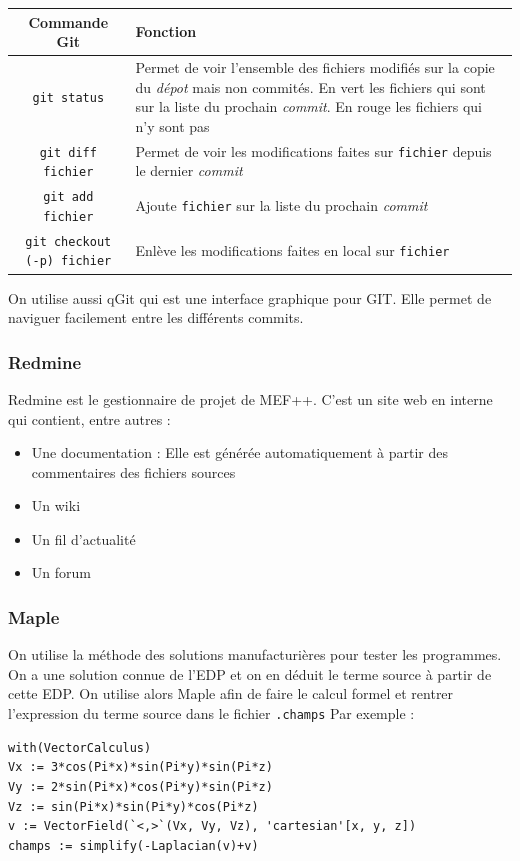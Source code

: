 \documentclass[a4paper,12pt]{article}
\begin{document}
\begin{table}[!h]
\begin{center}
  \begin{tabularx}{\textwidth}{|c|X|}
  \hline
  \textbf{Commande Git} & \textbf{Fonction} \\
  \hline
  \texttt{git status} & Permet de voir l'ensemble des fichiers modifiés sur la copie du \emph{dépot} mais non commités. En vert les fichiers qui sont sur la liste du prochain \emph{commit}. En rouge les fichiers qui n'y sont pas \\
  \hline
  \texttt{git diff fichier} & Permet de voir les modifications faites sur \texttt{fichier} depuis le dernier \emph{commit} \\
  \hline
  \texttt{git add fichier} & Ajoute \texttt{fichier} sur la liste du prochain \emph{commit} \\
  \hline
  \texttt{git checkout (-p) fichier} & Enlève les modifications faites en local sur \texttt{fichier} \\
  \hline
  \end{tabularx}
\end{center}
\end{table}

On utilise aussi qGit qui est une interface graphique pour GIT. Elle permet de naviguer facilement entre les différents commits.
\subsubsection{Redmine}
Redmine est le gestionnaire de projet de MEF++. C'est un site web en interne qui contient, entre autres : 
\begin{itemize}
\item Une documentation : Elle est générée automatiquement à partir des commentaires des fichiers sources
\item Un wiki
\item Un fil d'actualité
\item Un forum
\end{itemize}

\subsubsection{Maple}

On utilise la méthode des solutions manufacturières pour tester les programmes. 
On a une solution connue de l'EDP et on en déduit le terme source à partir de cette EDP.
On utilise alors Maple afin de faire le calcul formel et rentrer l'expression du terme source dans le fichier \texttt{.champs}
Par exemple :
\begin{verbatim}
with(VectorCalculus)
Vx := 3*cos(Pi*x)*sin(Pi*y)*sin(Pi*z)
Vy := 2*sin(Pi*x)*cos(Pi*y)*sin(Pi*z)
Vz := sin(Pi*x)*sin(Pi*y)*cos(Pi*z)
v := VectorField(`<,>`(Vx, Vy, Vz), 'cartesian'[x, y, z])
champs := simplify(-Laplacian(v)+v)
\end{verbatim}
\end{document}
